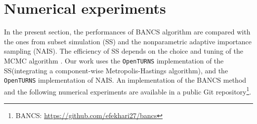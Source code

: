 
%



\section{Numerical experiments}\label{sec:bancs_bench}

In the present section, the performances of BANCS algorithm are compared with the ones from subset simulation (SS) and the nonparametric adaptive importance sampling (NAIS). 
The efficiency of SS depends on the choice and tuning of the MCMC algorithm \citep{Papaioannou_PEM_2015}. 
Our work uses the \texttt{OpenTURNS} implementation of the SS\footnotemark (integrating a component-wise Metropolis-Hastings algorithm), 
and the \texttt{OpenTURNS} implementation of NAIS\footnotemark. 
An implementation of the BANCS method and the following numerical experiments are available in a public Git repository\footnote{BANCS: \url{https://github.com/efekhari27/bancs}}. 

